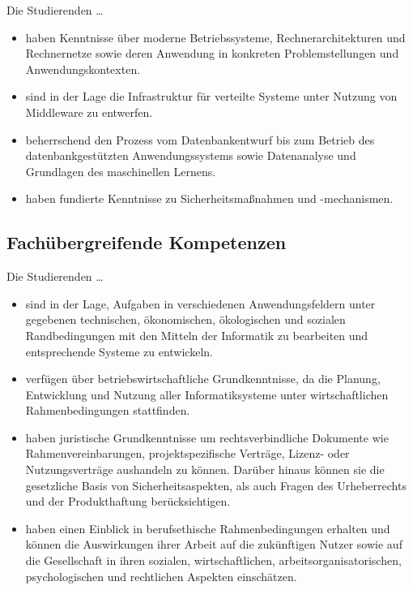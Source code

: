 Die Studierenden \ldots{}

\begin{itemize}
\tightlist
\item
  haben Kenntnisse über moderne Betriebssysteme, Rechnerarchitekturen
  und Rechnernetze sowie deren Anwendung in konkreten Problemstellungen
  und Anwendungskontexten.
\item
  sind in der Lage die Infrastruktur für verteilte Systeme unter Nutzung
  von Middleware zu entwerfen.
\item
  beherrschend den Prozess vom Datenbankentwurf bis zum Betrieb des
  datenbankgestützten Anwendungssystems sowie Datenanalyse und
  Grundlagen des maschinellen Lernens.
\item
  haben fundierte Kenntnisse zu Sicherheitsmaßnahmen und -mechanismen.
\end{itemize}

\subsection{Fachübergreifende
Kompetenzen}\label{fachuxfcbergreifende-kompetenzen}

Die Studierenden \ldots{}

\begin{itemize}
\tightlist
\item
  sind in der Lage, Aufgaben in verschiedenen Anwendungsfeldern unter
  gegebenen technischen, ökonomischen, ökologischen und sozialen
  Randbedingungen mit den Mitteln der Informatik zu bearbeiten und
  entsprechende Systeme zu entwickeln.
\item
  verfügen über betriebswirtschaftliche Grundkenntnisse, da die Planung,
  Entwicklung und Nutzung aller Informatiksysteme unter wirtschaftlichen
  Rahmenbedingungen stattfinden.
\item
  haben juristische Grundkenntnisse um rechtsverbindliche Dokumente wie
  Rahmenvereinbarungen, projektspezifische Verträge, Lizenz- oder
  Nutzungsverträge aushandeln zu können. Darüber hinaus können sie die
  gesetzliche Basis von Sicherheitsaspekten, als auch Fragen des
  Urheberrechts und der Produkthaftung berücksichtigen.
\item
  haben einen Einblick in berufsethische Rahmenbedingungen erhalten und
  können die Auswirkungen ihrer Arbeit auf die zukünftigen Nutzer sowie
  auf die Gesellschaft in ihren sozialen, wirtschaftlichen,
  arbeitsorganisatorischen, psychologischen und rechtlichen Aspekten
  einschätzen.
\end{itemize}

